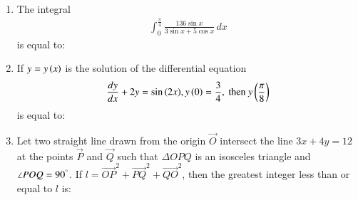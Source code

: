 \documentclass[journal]{IEEEtran}
\numberwithin{equation}{enumi}
\numberwithin{figure}{enumi}
\begin{document}
\begin{enumerate}

    \item 
    The integral 
    \begin{align*}
        \int_0^{\frac{\pi}{4}}\frac{136\sin{x}}{3\sin{x} + 5\cos{x}}\, dx 
    \end{align*}
    is equal to:

    \hfill{}

    \begin{enumerate}
    \end{enumerate}

    \item 
    If $y = y\left(x\right)$ is the solution of the differential equation 
    \begin{align*}
        \frac{dy}{dx} + 2y = \sin{\ensuremath{\left(2x\right)}}, y\left(0\right) = \frac{3}{4}, \text{ then } y\left(\frac{\pi}{8}\right)
    \end{align*}
    is equal to:

    \hfill{}

    \begin{enumerate}
    \end{enumerate}

    \item 
    Let two straight line drawn from the origin $\vec{O}$ intersect the line $3x + 4y = 12$ at the points $\vec{P}$ and $\vec{Q}$ such that $\Delta OPQ$ is an isosceles triangle and $\angle POQ = 90^{\degree}$. If $l = \vec{OP}^2 + \vec{PQ}^2 + \vec{QO}^2$, then the greatest integer less than or equal to $l$ is:


\end{enumerate}
\end{document}
